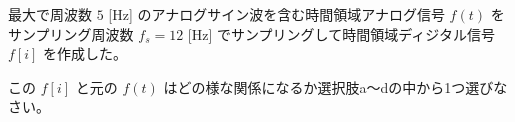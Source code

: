 最大で周波数 $5$ [Hz] のアナログサイン波を含む時間領域アナログ信号 $f(t)$ をサンプリング周波数 $f_s = 12$ [Hz] でサンプリングして時間領域ディジタル信号 $f[i]$ を作成した。\par
この $f[i]$ と元の $f(t)$ はどの様な関係になるか選択肢a〜dの中から1つ選びなさい。
